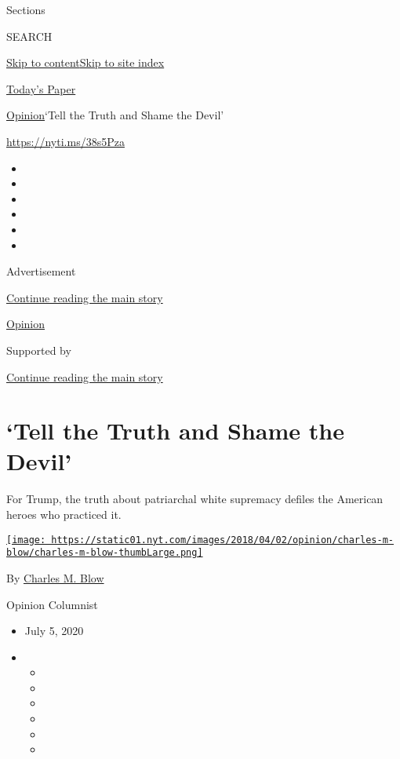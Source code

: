 Sections

SEARCH

\protect\hyperlink{site-content}{Skip to
content}\protect\hyperlink{site-index}{Skip to site index}

\href{https://myaccount.nytimes.com/auth/login?response_type=cookie\&client_id=vi}{}

\href{https://www.nytimes.com/section/todayspaper}{Today's Paper}

\href{/section/opinion}{Opinion}\textbar{}`Tell the Truth and Shame the
Devil'

\url{https://nyti.ms/38s5Pza}

\begin{itemize}
\item
\item
\item
\item
\item
\item
\end{itemize}

Advertisement

\protect\hyperlink{after-top}{Continue reading the main story}

\href{/section/opinion}{Opinion}

Supported by

\protect\hyperlink{after-sponsor}{Continue reading the main story}

\hypertarget{tell-the-truth-and-shame-the-devil}{%
\section{`Tell the Truth and Shame the
Devil'}\label{tell-the-truth-and-shame-the-devil}}

For Trump, the truth about patriarchal white supremacy defiles the
American heroes who practiced it.

\href{https://www.nytimes.com/by/charles-m-blow}{\texttt{[image: https://static01.nyt.com/images/2018/04/02/opinion/charles-m-blow/charles-m-blow-thumbLarge.png]}}

By \href{https://www.nytimes.com/by/charles-m-blow}{Charles M. Blow}

Opinion Columnist

\begin{itemize}
\item
  July 5, 2020
\item
  \begin{itemize}
  \item
  \item
  \item
  \item
  \item
  \item
  \end{itemize}
\end{itemize}

